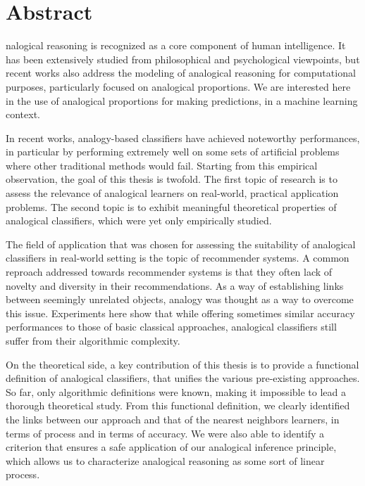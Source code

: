 \chapter*{Abstract}

nalogical reasoning is recognized as a core component of human
intelligence. It has been extensively studied from philosophical and
psychological viewpoints, but recent works also address the modeling of
analogical reasoning for computational purposes, particularly focused on
analogical proportions. We are interested here in the use of analogical
proportions for making predictions, in a machine learning context.

In recent works, analogy-based classifiers have achieved noteworthy
performances, in particular by performing extremely well on some sets of
artificial problems where other traditional methods would fail. Starting from
this empirical observation, the goal of this thesis is twofold. The first topic
of research is to assess the relevance of analogical learners on real-world,
practical application problems.  The second topic is to exhibit meaningful
theoretical properties of analogical classifiers, which were yet only
empirically studied.

The field of application that was chosen for assessing the suitability of
analogical classifiers in real-world setting is the topic of recommender
systems. A common reproach addressed towards recommender systems is that they
often lack of novelty and diversity in their recommendations. As a way of
establishing links between seemingly unrelated objects, analogy was thought as
a way to overcome this issue. Experiments here show that while offering
sometimes similar accuracy performances to those of basic classical approaches,
analogical classifiers still suffer from their algorithmic complexity.

On the theoretical side, a key contribution of this thesis is to provide a
functional definition of analogical classifiers, that unifies the various
pre-existing approaches. So far, only algorithmic definitions were known, making
it impossible to lead a thorough theoretical study. From this functional
definition, we clearly identified the links between our approach and that of
the nearest neighbors learners, in terms of process and in terms of accuracy.
We were also able to identify a criterion that ensures a safe application of our
analogical inference principle, which allows us to characterize analogical
reasoning as some sort of linear process.
\newpage

